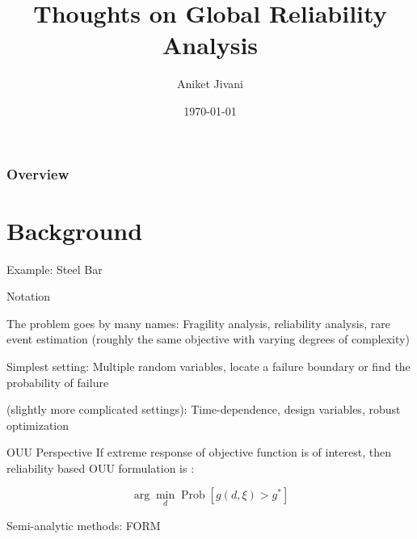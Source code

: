 \documentclass[usenames,dvipsnames]{beamer}
\title[Seminar]{Thoughts on Global Reliability Analysis}
\author[AJ]{Aniket Jivani}
\institute[U-M]{Department of Mechanical Engineering, \\ University of Michigan}
\date{\today}
\theoremstyle{definition}
\let\oldcite=\cite
\renewcommand{\cite}[2][]{\textcolor{green}{\oldcite[#1]{#2}}}
\begin{document}
\begin{frame}
\titlepage %
\end{frame}



\begin{frame}
 \frametitle{Overview} %
 \tableofcontents %
\end{frame}

\section{Background}
\begin{frame}{Example: Steel Bar}

\end{frame}

\begin{frame}{Notation}

The problem goes by many names: Fragility analysis, reliability analysis, rare event estimation (roughly the same objective with varying degrees of complexity)

Simplest setting: Multiple random variables, locate a failure boundary or find the probability of failure

(slightly more complicated settings): Time-dependence, design variables, robust optimization

\end{frame}

\begin{frame}{OUU Perspective}
    If extreme response of objective function is of interest, then reliability based OUU formulation is \cite{giunta_perspectives_2004}:


    $$\arg \min_d \operatorname{Prob}[g(d, \xi) > g^{\ast}]$$

\end{frame}

\begin{frame}{Semi-analytic methods: FORM}

\end{frame}
\end{document}
